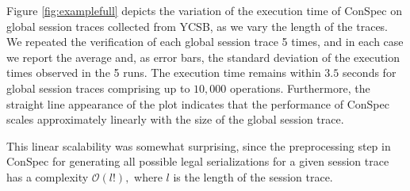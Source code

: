 \documentclass[journal,compsoc]{IEEEtran}
\begin{document}
   Figure \ref{fig:examplefull} depicts the variation of the execution time of ConSpec on global session  traces collected from YCSB, as we vary the length of the traces. We repeated the verification of each global session trace 5 times,  and in each case we report the average and, as error bars, the standard deviation of the execution times observed in the 5 runs.
   The execution time remains within $3.5$ seconds for global session traces comprising up to $10,000$  operations. Furthermore, the straight line appearance of the plot indicates that the performance of ConSpec scales approximately linearly with the size of the global session trace.
   \par This linear scalability was somewhat surprising, since the preprocessing step in ConSpec for generating all possible legal serializations for a given session trace has a complexity $\mathcal{O}(\mathit{l}!),$ where $\mathit{l}$ is the length of the session trace. 
   
\end{document}

